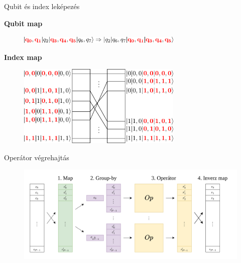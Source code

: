 \documentclass[aspectratio=169]{beamer}
\begin{document}
\begin{frame}{Qubit és index leképezés}

\vspace{0.25cm}
\textbf{Qubit map}
\vspace{-0.4cm}
\begin{figure}[H]
    \centering
    \includegraphics[width=0.7\textwidth]{figures/qubit_mapping.png}
\end{figure}
\vspace{-0.4cm}
\textbf{Index map}
\vspace{-0.4cm}
\begin{figure}[H]
  \centering
  \includegraphics[width=0.7\textwidth]{figures/index_mapping.png}
\end{figure}

\end{frame}


\begin{frame}{Operátor végrehajtás}

\begin{figure}[H]
    \centering
    \includegraphics[width=\textwidth]{figures/qubit_map_group_by.png}
\end{figure}

\end{frame}
\end{document}
